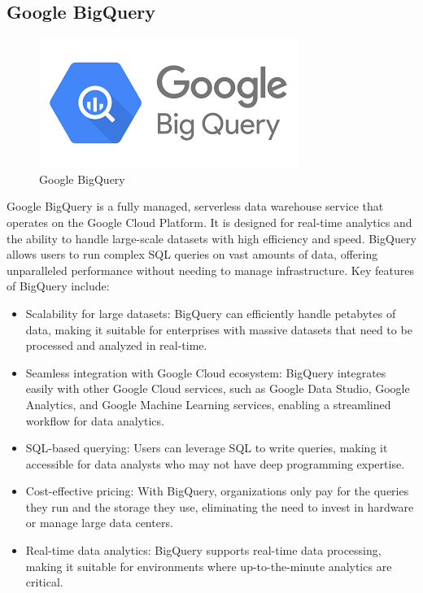 \subsection{Google BigQuery}
\begin{figure}[htp]
    \centering
    \includegraphics[width=0.5\linewidth]{images/bigquery.png}
    \caption{Google BigQuery}
\end{figure}

Google BigQuery is a fully managed, serverless data warehouse service that operates on the Google
Cloud Platform. It is designed for real-time analytics and the ability to handle large-scale
datasets with high efficiency and speed. BigQuery allows users to run complex SQL queries on vast
amounts of data, offering unparalleled performance without needing to manage infrastructure. Key
features of BigQuery include:
\begin{itemize}
    \item 

Scalability for large datasets: BigQuery can efficiently handle petabytes of data, making it
suitable for enterprises with massive datasets that need to be processed and analyzed in real-time.
\item Seamless integration with Google Cloud ecosystem: BigQuery integrates easily with other Google
Cloud services, such as Google Data Studio, Google Analytics, and Google Machine Learning services,
enabling a streamlined workflow for data analytics.
\item SQL-based querying: Users can leverage SQL to write queries, making it accessible for data
analysts who may not have deep programming expertise.
\item Cost-effective pricing: With BigQuery, organizations only pay for the queries they run and the
storage they use, eliminating the need to invest in hardware or manage large data centers.
\item Real-time data analytics: BigQuery supports real-time data processing, making it suitable for
environments where up-to-the-minute analytics are critical.
\end{itemize}

